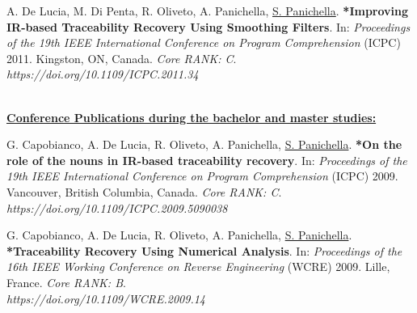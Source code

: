 \documentclass[10pt]{article}
\renewcommand{\section}[1]{\pagebreak[3]%
    \vspace{1.3\baselineskip}%
    \phantomsection\addcontentsline{toc}{section}{#1}%
    \noindent\llap{\scshape\smash{\parbox[t]{\marginparwidth}{\hyphenpenalty=10000\raggedright #1}}}%
    \vspace{-\baselineskip}\par}
\newcommand{\blankline}{\quad\pagebreak[3]}
\begin{document}
\begin{bibenum}
     \item  \label{C28}  A. De Lucia, M. Di Penta, R. Oliveto, A. Panichella, \underline{S. Panichella}. \textbf{*Improving IR-based Traceability Recovery Using Smoothing Filters}. In: \emph{Proceedings of the 19th IEEE International Conference on Program Comprehension} (ICPC) 2011. Kingston, ON, Canada.  \textit{Core RANK: C}. \\\textit{https://doi.org/10.1109/ICPC.2011.34}

\end{bibenum}

\textbf{\\\underline{Conference Publications during the bachelor and master studies:}}\\
\begin{bibenum}
     \item  \label{C29}  G. Capobianco, A. De Lucia, R. Oliveto, A. Panichella, \underline{S. Panichella}. \textbf{*On the role of the nouns in IR-based traceability recovery}. In: \emph{Proceedings of the 19th IEEE International Conference on Program Comprehension} (ICPC) 2009. Vancouver, British Columbia, Canada.  \textit{Core RANK: C}.
\\\textit{https://doi.org/10.1109/ICPC.2009.5090038}

     \item  \label{C30}  G. Capobianco, A. De Lucia, R. Oliveto, A. Panichella, \underline{S. Panichella}. \textbf{*Traceability Recovery Using Numerical Analysis}. In: \emph{Proceedings of the 16th IEEE Working Conference on Reverse Engineering} (WCRE) 2009. Lille, France.  \textit{Core RANK: B}.\\ \textit{https://doi.org/10.1109/WCRE.2009.14}
     
\end{bibenum}



\end{document}
